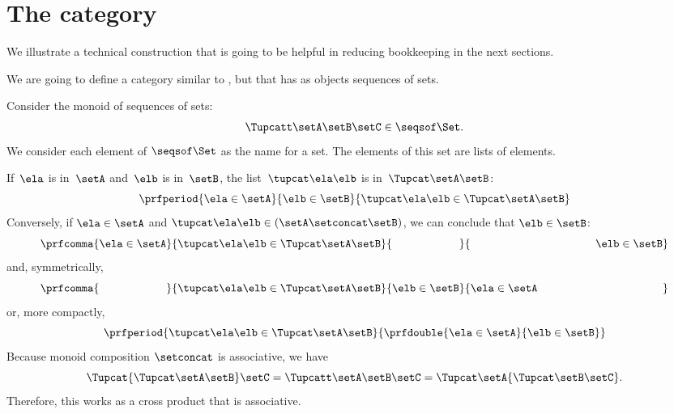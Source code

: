 \section{The \SetStar category}
\label{sec:SetStar}

We illustrate a technical construction that is going to be helpful in reducing bookkeeping in the next sections.

We are going to define a category similar to \Set, but that has as objects sequences of sets.

Consider the monoid of sequences of sets:
%
\begin{equation}
    \label{eq:sets-monoid}
    \Tupcatt \setA  \setB  \setC \in \seqsof\Set.
\end{equation}
%
We consider each element of $\seqsof\Set$ as the name for a set.
The elements of this set are lists of elements.

If~$\ela$ is in~$\setA$ and~$\elb$ is in~$\setB$, the list~$\tupcat \ela \elb$ is in~$\Tupcat \setA \setB$:
%
\begin{equation}
    \label{eq:sets-monoid-axiom1}
    \prfperiod{
        \ela \in \setA
    }{
        \elb \in \setB
    }{
        \tupcat \ela \elb \in \Tupcat \setA \setB
    }
\end{equation}
%
Conversely, if $\ela \in \setA$ and $\tupcat \ela \elb \in (\setA \setconcat \setB)$, we can conclude that $\elb \in \setB$:
%
\begin{equation}
    \label{eq:sets-monoid-axiom2}
    \prfcomma{
        \ela \in \setA
    }{
        \tupcat \ela \elb \in \Tupcat \setA  \setB
    }{
        \phantom{\elb \in \setB}
    }{
        \rule{39mm}{0pt} \elb \in  \setB
    }
\end{equation}
%
and, symmetrically,
%
\begin{equation}
    \label{eq:sets-monoid-axiom3}
    \prfcomma{
        \phantom{\ela \in \setA}
    }{
        \tupcat \ela \elb \in \Tupcat \setA \setB
    }{
        \elb \in \setB
    }{
        \ela \in  \setA \rule{39mm}{0pt}
    }
\end{equation}
%
or, more compactly,
%
\begin{equation}
    \label{eq:sets-monoid-axiom3bis}
    \prfperiod{
        \tupcat \ela \elb \in \Tupcat \setA \setB
    }{
        \prfdouble{
            \ela \in \setA
        }{
            \elb \in \setB
        }
    }
\end{equation}
%
Because monoid composition $\setconcat$ is associative, we have
%
\begin{equation}
    \label{eq:sets-monoid-comp}
    \Tupcat {\Tupcat \setA  \setB}  \setC  =
    \Tupcatt \setA    \setB \setC  =
    \Tupcat   \setA  {\Tupcat \setB  \setC}.
\end{equation}
%
Therefore, this works as a cross product that is associative.

